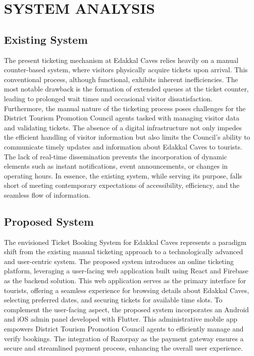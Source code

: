 \documentclass[12pt,a4paper]{report}
\begin{document}
\clearpage
\chapter{SYSTEM ANALYSIS}
\section{Existing System}
The present ticketing mechanism at Edakkal Caves relies heavily on a manual counter-based system, where visitors physically acquire tickets upon arrival. This conventional process, although functional, exhibits inherent inefficiencies. The most notable drawback is the formation of extended queues at the ticket counter, leading to prolonged wait times and occasional visitor dissatisfaction. Furthermore, the manual nature of the ticketing process poses challenges for the District Tourism Promotion Council agents tasked with managing visitor data and validating tickets.
The absence of a digital infrastructure not only impedes the efficient handling of visitor information but also limits the Council's ability to communicate timely updates and information about Edakkal Caves to tourists. The lack of real-time dissemination prevents the incorporation of dynamic elements such as instant notifications, event announcements, or changes in operating hours. In essence, the existing system, while serving its purpose, falls short of meeting contemporary expectations of accessibility, efficiency, and the seamless flow of information.

\section{Proposed System}
The envisioned Ticket Booking System for Edakkal Caves represents a paradigm shift from the existing manual ticketing approach to a technologically advanced and user-centric system. The proposed system introduces an online ticketing platform, leveraging a user-facing web application built using React and Firebase as the backend solution. This web application serves as the primary interface for tourists, offering a seamless experience for browsing details about Edakkal Caves, selecting preferred dates, and securing tickets for available time slots.
To complement the user-facing aspect, the proposed system incorporates an Android and iOS admin panel developed with Flutter. This administrative mobile app empowers District Tourism Promotion Council agents to efficiently manage and verify bookings. The integration of Razorpay as the payment gateway ensures a secure and streamlined payment process, enhancing the overall user experience.
\end{document}
